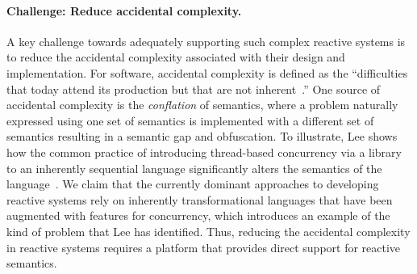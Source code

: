 \paragraph{Challenge:  Reduce accidental complexity.}
A key challenge towards adequately supporting such complex reactive systems is to reduce the accidental complexity associated with their design and implementation.
For software, accidental complexity is defined as the ``difficulties that today attend its production but that are not inherent~\cite{brooks1995mythical}.''
One source of accidental complexity is the \emph{conflation} of semantics, where a problem naturally expressed using one set of semantics is implemented with a different set of semantics resulting in a semantic gap and obfuscation.
To illustrate, Lee shows how the common practice of introducing thread-based concurrency via a library to an inherently sequential language significantly alters the semantics of the language~\cite{lee2006problem}.
We claim that the currently dominant approaches to developing reactive systems rely on inherently transformational languages that have been augmented with features for concurrency, which introduces an example of the kind of problem that Lee has identified.
Thus, reducing the accidental complexity in reactive systems requires a platform that provides direct support for reactive semantics.

